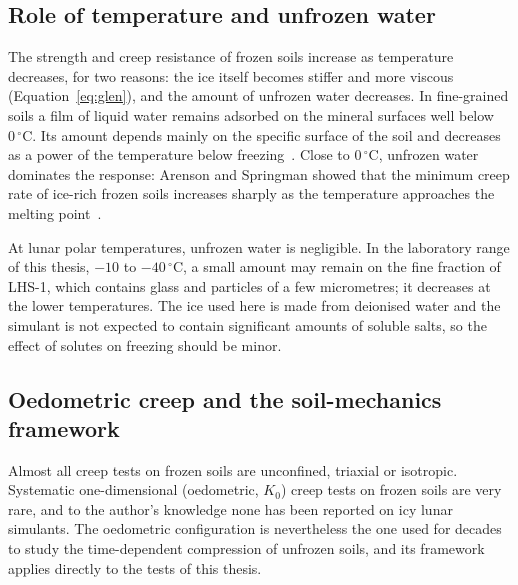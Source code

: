 \subsection{Role of temperature and unfrozen water}

The strength and creep resistance of frozen soils increase as temperature decreases, for two reasons: the ice itself becomes stiffer and more viscous (Equation~\eqref{eq:glen}), and the amount of unfrozen water decreases. In fine-grained soils a film of liquid water remains adsorbed on the mineral surfaces well below $0\,^\circ$C. Its amount depends mainly on the specific surface of the soil and decreases as a power of the temperature below freezing~\cite{anderson1972}. Close to $0\,^\circ$C, unfrozen water dominates the response: Arenson and Springman showed that the minimum creep rate of ice-rich frozen soils increases sharply as the temperature approaches the melting point~\cite{arenson2005}.

At lunar polar temperatures, unfrozen water is negligible. In the laboratory range of this thesis, $-10$ to $-40\,^\circ$C, a small amount may remain on the fine fraction of LHS-1, which contains glass and particles of a few micrometres; it decreases at the lower temperatures. The ice used here is made from deionised water and the simulant is not expected to contain significant amounts of soluble salts, so the effect of solutes on freezing should be minor.

\subsection{Oedometric creep and the soil-mechanics framework}
\label{subsec:soil_creep}

Almost all creep tests on frozen soils are unconfined, triaxial or isotropic. Systematic one-dimensional (oedometric, $K_0$) creep tests on frozen soils are very rare, and to the author's knowledge none has been reported on icy lunar simulants. The oedometric configuration is nevertheless the one used for decades to study the time-dependent compression of unfrozen soils, and its framework applies directly to the tests of this thesis.


